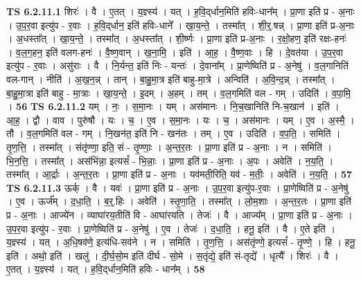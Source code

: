 \documentclass[17pt]{extarticle}
\begin{document}
                                \textbf{ TS 6.2.11.1} \newline
                  शिरः॑ । वै । ए॒तत् । य॒ज्ञ्स्य॑ । यत् । ह॒वि॒द्‌र्धान॒मिति॑ हविः-धान᳚म् । प्रा॒णा इति॑ प्र - अ॒नाः । उ॒प॒र॒वा इत्यु॑प - र॒वाः । ह॒वि॒द्‌र्धान॒ इति॑ हविः-धाने᳚ । खा॒य॒न्ते॒ । तस्मा᳚त् । शी॒र्॒.षन्न् । प्रा॒णा इति॑ प्र-अ॒नाः । अ॒धस्ता᳚त् । खा॒य॒न्ते॒ । तस्मा᳚त् । अ॒धस्ता᳚त् । शी॒र्ष्णः । प्रा॒णा इति॑ प्र-अ॒नाः । र॒क्षो॒हण॒ इति॑ रक्षः-हनः॑ । व॒ल॒ग॒हन॒ इति॑ वलग-हनः॑ । वै॒ष्ण॒वान् । ख॒ना॒मि॒ । इति॑ । आ॒ह॒ । वै॒ष्ण॒वाः । हि । दे॒वत॑या । उ॒प॒र॒वा इत्यु॑प - र॒वाः । असु॑राः । वै । नि॒र्यन्त॒ इति॑ निः - यन्तः॑ । दे॒वाना᳚म् । प्रा॒णेष्विति॑ प्र - अ॒नेषु॑ । व॒ल॒गानिति॑ वल-गान् । नीति॑ । अ॒ख॒न॒न्न् । तान् । बा॒हु॒मा॒त्र इति॑ बाहु-मा॒त्रे । अन्विति॑ । अ॒वि॒न्द॒न्न् । तस्मा᳚त् । बा॒हु॒मा॒त्रा इति॑ बाहु - मा॒त्राः । खा॒य॒न्ते॒ । इ॒दम् । अ॒हम् । तम् । व॒ल॒गमिति॑ वल - गम् । उदिति॑ । व॒पा॒मि॒ । \textbf{  56} \newline
                  \newline
                                \textbf{ TS 6.2.11.2} \newline
                  यम् । नः॒ । स॒मा॒नः । यम् । अस॑मानः । नि॒च॒खानिति॑ नि-च॒खान॑ । इति॑ । आ॒ह॒ । द्वौ । वाव । पुरु॑षौ । यः । च॒ । ए॒व । स॒मा॒नः । यः । च॒ । अस॑मानः । यम् । ए॒व । अ॒स्मै॒ । तौ । व॒ल॒गमिति॑ वल - गम् । नि॒खन॑त॒ इति॑ नि - खन॑तः । तम् । ए॒व । उदिति॑ । व॒प॒ति॒ । समिति॑ । तृ॒ण॒त्ति॒ । तस्मा᳚त् । संतृ॑ण्णा॒ इति॒ सं - तृ॒ण्णाः॒ । अ॒न्त॒र॒तः । प्रा॒णा इति॑ प्र - अ॒नाः । न । समिति॑ । भि॒न॒त्ति॒ । तस्मा᳚त् । अस॑भिंन्ना॒ इत्यसं᳚ - भि॒न्नाः॒ । प्रा॒णा इति॑ प्र - अ॒नाः । अ॒पः । अवेति॑ । न॒य॒ति॒ । तस्मा᳚त् । आ॒र्द्राः । अ॒न्त॒र॒तः । प्रा॒णा इति॑ प्र - अ॒नाः । यव॑मती॒रिति॒ यव॑ - म॒तीः॒ । अवेति॑ । न॒य॒ति॒ । \textbf{  57} \newline
                  \newline
                                \textbf{ TS 6.2.11.3} \newline
                  ऊर्क् । वै । यवः॑ । प्रा॒णा इति॑ प्र - अ॒नाः । उ॒प॒र॒वा इत्यु॑प-र॒वाः । प्रा॒णेष्विति॑ प्र - अ॒नेषु॑ । ए॒व । ऊर्ज᳚म् । द॒धा॒ति॒ । ब॒र्॒.हिः । अवेति॑ । स्तृ॒णा॒ति॒ । तस्मा᳚त् । लो॒म॒शाः । अ॒न्त॒र॒तः । प्रा॒णा इति॑ प्र - अ॒नाः । आज्ये॑न । व्याघा॑रय॒तीति॑ वि - आघा॑रयति । तेजः॑ । वै । आज्य᳚म् । प्रा॒णा इति॑ प्र - अ॒नाः । उ॒प॒र॒वा इत्यु॑प - र॒वाः । प्रा॒णेष्विति॑ प्र - अ॒नेषु॑ । ए॒व । तेजः॑ । द॒धा॒ति॒ । हनू॒ इति॑ । वै । ए॒ते इति॑ । य॒ज्ञ्स्य॑ । यत् । अ॒धि॒षव॑णे॒ इत्य॑धि-सव॑ने । न । समिति॑ । तृ॒ण॒त्ति॒ । अस॑तृंण्णे॒ इत्यसं᳚ - तृ॒ण्णे॒ । हि । हनू॒ इति॑ । अथो॒ इति॑ । खलु॑ । दी॒र्घ॒सो॒म इति॑ दीर्घ - सो॒मे । स॒तृंद्ये॒ इति॑ सं-तृद्ये᳚ । धृत्यै᳚ । शिरः॑ । वै । ए॒तत् । य॒ज्ञ्स्य॑ । यत् । ह॒वि॒द्‌र्धान॒मिति॑ हविः - धान᳚म् । \textbf{  58} \newline
\end{document}
